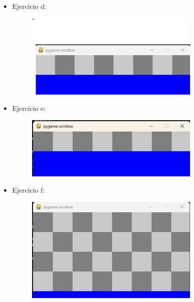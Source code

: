 \documentclass{article}
\begin{document}
\begin{itemize}
		\item Ejercicio d:
	\begin{figure}[H]
		\centering
		\includegraphics[width=0.8\textwidth,keepaspectratio]{img/ejercicio2d.png}
	\end{figure}
	\end{itemize}
	\begin{itemize}
		\item Ejercicio e:
	\begin{figure}[H]
		\centering
		\includegraphics[width=0.8\textwidth,keepaspectratio]{img/ejercicio2e.png}
	\end{figure}
	\end{itemize}
 \begin{itemize}
		\item Ejercicio f:
	\begin{figure}[H]
		\centering
		\includegraphics[width=0.8\textwidth,keepaspectratio]{img/ejercicio2f.png}
	\end{figure}
	\end{itemize}
\end{document}
